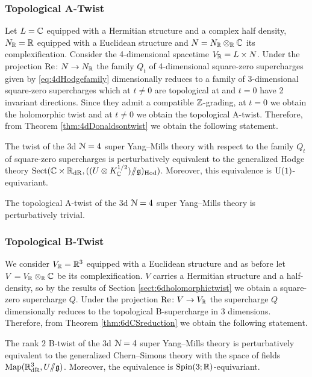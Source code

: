 \documentclass[10pt, oneside]{article}
\begin{document}
\subsubsection{Topological A-Twist}
\label{sect:3d_4_A_twist}
Let $L=\mathbb C$ equipped with a Hermitian structure and a complex half density, $N_\mathbb R=\mathbb R$ equipped with a Euclidean structure and $N=N_\mathbb R\otimes_\mathbb R\mathbb C$ its complexification. Consider the 4-dimensional spacetime $V_\mathbb R=L\times N$. Under the projection $\mathrm{Re}\colon N\rightarrow N_\mathbb R$ the family $Q_t$ of 4-dimensional square-zero supercharges given by \eqref{eq:4dHodgefamily} dimensionally reduces to a family of 3-dimensional square-zero supercharges which at $t\neq 0$ are topological at and $t=0$ have 2 invariant directions. Since they admit a compatible $\mathbb Z$-grading, at $t=0$ we obtain the holomorphic twist and at $t\neq 0$ we obtain the topological A-twist. Therefore, from Theorem \ref{thm:4dDonaldsontwist} we obtain the following statement.

\begin{theorem}
The twist of the 3d $\mathcal N=4$ super Yang--Mills theory with respect to the family $Q_t$ of square-zero supercharges is perturbatively equivalent to the generalized Hodge theory $\mathrm{Sect}(\mathbb C \times \mathbb R_{\mathrm{dR}}, ((U \otimes K^{1/2}_\mathbb C)/\!\!/ \mathfrak{g})_{\mathrm{Hod}})$. Moreover, this equivalence is $\mathrm{U}(1)$-equivariant.
\label{3d_4_A_twist_thm}
\end{theorem}

\begin{corollary}
The topological A-twist of the 3d $\mathcal N=4$ super Yang--Mills theory is perturbatively trivial.
\end{corollary}

\subsubsection{Topological B-Twist}
\label{sect:3d_4_B_twist}
We consider $V_\mathbb R=\mathbb R^3$ equipped with a Euclidean structure and as before let $V=V_\mathbb R\otimes_\mathbb R\mathbb C$ be its complexification. $V$ carries a Hermitian structure and a half-density, so by the results of Section \ref{sect:6dholomorphictwist} we obtain a square-zero supercharge $Q$. Under the projection $\mathrm{Re}\colon V\rightarrow V_\mathbb R$ the supercharge $Q$ dimensionally reduces to the topological B-supercharge in 3 dimensions. Therefore, from Theorem \ref{thm:6dCSreduction} we obtain the following statement.

\begin{theorem} \label{3d_4_B_twist_thm}
The rank $2$ B-twist of the 3d $\mathcal{N}=4$ super Yang--Mills theory is perturbatively equivalent to the generalized Chern--Simons theory with the space of fields $\operatorname{Map}(\mathbb R^3_{\mathrm{dR}}, U/\!\!/ \mathfrak{g})$. Moreover, the equivalence is $\mathrm{Spin}(3; \mathbb R)$-equivariant.
\end{theorem}
\end{document}
